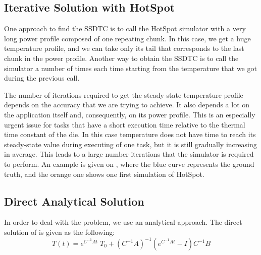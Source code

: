 \subsection{Iterative Solution with HotSpot}
One approach to find the SSDTC is to call the HotSpot simulator with a very long power profile composed of one repeating chunk. In this case, we get a huge temperature profile, and we can take only its tail that corresponds to the last chunk in the power profile. Another way to obtain the SSDTC is to call the simulator a number of times each time starting from the temperature that we got during the previous call.


The number of iterations required to get the steady-state temperature profile depends on the accuracy that we are trying to achieve. It also depends a lot on the application itself and, consequently, on its power profile. This is an especially urgent issue for tasks that have a short execution time relative to the thermal time constant of the die. In this case temperature does not have time to reach its steady-state value during executing of one task, but it is still gradually increasing in average. This leads to a large number iterations that the simulator is required to perform. An example is given on , where the blue curve represents the ground truth, and the orange one shows one first simulation of HotSpot.

\subsection{Direct Analytical Solution}
In order to deal with the problem, we use an analytical approach. The direct solution of  is given as the following:
\begin{equation} \label{eq:solution}
  T(t) = e^{C^{-1}A t} \; T_0 + (C^{-1} A)^{-1}(e^{C^{-1}A t} - I)C^{-1} B
\end{equation}

